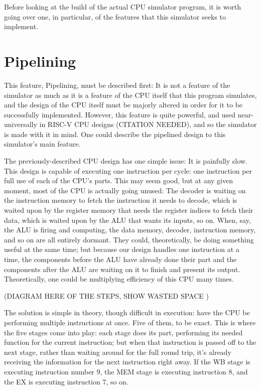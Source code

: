 \documentclass[12pt,twoside]{reedthesis}
\begin{document}
Before looking at the build of the actual CPU simulator program, it is worth going over one, in particular, of the features that this simulator seeks to implement.

\section{Pipelining}

This feature, Pipelining, must be described first: It is not a feature of the simulator as much as it is a feature of the CPU itself that this program simulates, and the design of the CPU itself must be majorly altered in order for it to be successfully implemented. However, this feature is quite powerful, and used near-universally in RISC-V CPU designs (CITATION NEEDED), and so the simulator is made with it in mind. One could describe the pipelined design to this simulator's main feature.

The previously-described CPU design has one simple issue: It is painfully slow. This design is capable of executing one instruction per cycle: one instruction per full use of each of the CPU's parts. This may seem good, but at any given moment, most of the CPU is actually going unused: The decoder is waiting on the instruction memory to fetch the instruction it needs to decode, which is waited upon by the register memory that needs the register indices to fetch their data, which is waited upon by the ALU that wants its inputs, so on.
When, say, the ALU is firing and computing, the data memory, decoder, instruction memory, and so on are all entirely dormant. They could, theoretically, be doing something useful at the same time; but because our design handles one instruction at a time, the components before the ALU have already done their part and the components after the ALU are waiting on it to finish and present its output. Theoretically, one could be multiplying efficiency of this CPU many times.

(DIAGRAM HERE OF THE STEPS, SHOW WASTED SPACE )

The solution is simple in theory, though difficult in execution: have the CPU be performing multiple instructions at once. Five of them, to be exact. This is where the five stages come into play: each stage does its part, performing its needed function for the current instruction; but when that instruction is passed off to the next stage, rather than waiting around for the full round trip, it's already receiving the information for the next instruction right away. If the WB stage is executing instruction number 9, the MEM stage is executing instruction 8, and the EX is executing instruction 7, so on.
\end{document}
